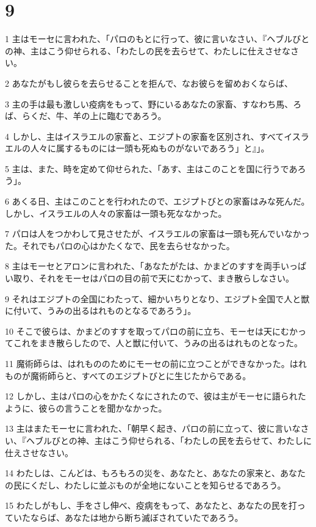 \chapter{9}

\par 1 主はモーセに言われた、「パロのもとに行って、彼に言いなさい、『ヘブルびとの神、主はこう仰せられる、「わたしの民を去らせて、わたしに仕えさせなさい。
\par 2 あなたがもし彼らを去らせることを拒んで、なお彼らを留めおくならば、
\par 3 主の手は最も激しい疫病をもって、野にいるあなたの家畜、すなわち馬、ろば、らくだ、牛、羊の上に臨むであろう。
\par 4 しかし、主はイスラエルの家畜と、エジプトの家畜を区別され、すべてイスラエルの人々に属するものには一頭も死ぬものがないであろう」と』」。
\par 5 主は、また、時を定めて仰せられた、「あす、主はこのことを国に行うであろう」。
\par 6 あくる日、主はこのことを行われたので、エジプトびとの家畜はみな死んだ。しかし、イスラエルの人々の家畜は一頭も死ななかった。
\par 7 パロは人をつかわして見させたが、イスラエルの家畜は一頭も死んでいなかった。それでもパロの心はかたくなで、民を去らせなかった。
\par 8 主はモーセとアロンに言われた、「あなたがたは、かまどのすすを両手いっぱい取り、それをモーセはパロの目の前で天にむかって、まき散らしなさい。
\par 9 それはエジプトの全国にわたって、細かいちりとなり、エジプト全国で人と獣に付いて、うみの出るはれものとなるであろう」。
\par 10 そこで彼らは、かまどのすすを取ってパロの前に立ち、モーセは天にむかってこれをまき散らしたので、人と獣に付いて、うみの出るはれものとなった。
\par 11 魔術師らは、はれもののためにモーセの前に立つことができなかった。はれものが魔術師らと、すべてのエジプトびとに生じたからである。
\par 12 しかし、主はパロの心をかたくなにされたので、彼は主がモーセに語られたように、彼らの言うことを聞かなかった。
\par 13 主はまたモーセに言われた、「朝早く起き、パロの前に立って、彼に言いなさい、『ヘブルびとの神、主はこう仰せられる、「わたしの民を去らせて、わたしに仕えさせなさい。
\par 14 わたしは、こんどは、もろもろの災を、あなたと、あなたの家来と、あなたの民にくだし、わたしに並ぶものが全地にないことを知らせるであろう。
\par 15 わたしがもし、手をさし伸べ、疫病をもって、あなたと、あなたの民を打っていたならば、あなたは地から断ち滅ぼされていたであろう。
